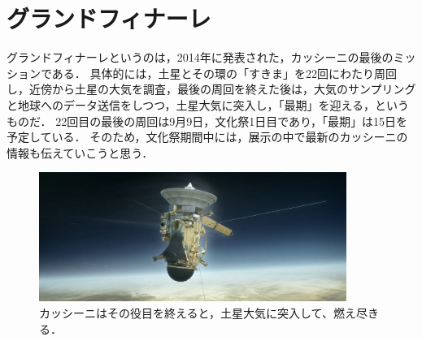 \section{グランドフィナーレ}
グランドフィナーレというのは，2014年に発表された，カッシーニの最後のミッションである．
具体的には，土星とその環の「すきま」を22回にわたり周回し，近傍から土星の大気を調査，最後の周回を終えた後は，大気のサンプリングと地球へのデータ送信をしつつ，土星大気に突入し，「最期」を迎える，というものだ．
22回目の最後の周回は9月9日，文化祭1日目であり，「最期」は15日を予定している．
そのため，文化祭期間中には，展示の中で最新のカッシーニの情報も伝えていこうと思う．
\begin{figure}
\centering
\includegraphics[width=10cm]{cassini-burn.jpg}
\caption{カッシーニはその役目を終えると，土星大気に突入して、燃え尽きる．}
\end{figure}


